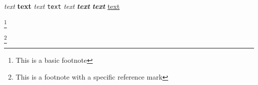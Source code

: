 \documentclass[12pt]{article}
\begin{document}

\inputminted{py}{path/to/file.py}



\emph{text}
\textbf{text}
\textit{text}
\texttt{text}
\textsl{text}
\textbf{\textit{text}}
\textit{\textbf{text}}
\underline{text}



\footnote{This is a basic footnote}

\footnote [ 5 ] {This is a footnote with a specific reference mark}


\footnotemark

\footnotemark  [ 1   ]
\end{document}
